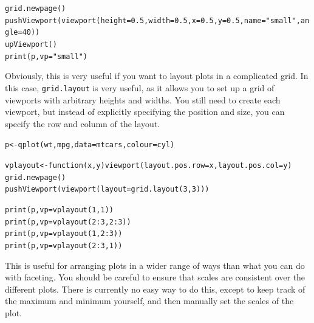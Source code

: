 \begin{alltt}
grid.newpage()
pushViewport(viewport(height=0.5, width=0.5, x=0.5, y=0.5, name="small", angle=40))
upViewport()
print(p, vp="small")
\end{alltt}

Obviously, this is very useful if you want to layout plots in a complicated grid.  In this case, {\tt grid.layout} is very useful, as it allows you to set up a grid of viewports with arbitrary heights and widths.  You still need to create each viewport, but instead of explicitly specifying the position and size, you can specify the row and column of the layout.

\begin{alltt}
p <- qplot(wt, mpg, data=mtcars, colour=cyl)

vplayout <- function(x, y) viewport(layout.pos.row=x, layout.pos.col=y)
grid.newpage()
pushViewport(viewport(layout=grid.layout(3,3)))

print(p, vp=vplayout(1,1))
print(p, vp=vplayout(2:3,2:3))
print(p, vp=vplayout(1, 2:3))
print(p, vp=vplayout(2:3, 1))
\end{alltt}

This is useful for arranging plots in a wider range of ways than what you can do with faceting.   You should be careful to ensure that scales are consistent over the different plots.  There is currently no easy way to do this, except to keep track of the maximum and minimum yourself, and then manually set the scales of the plot.




